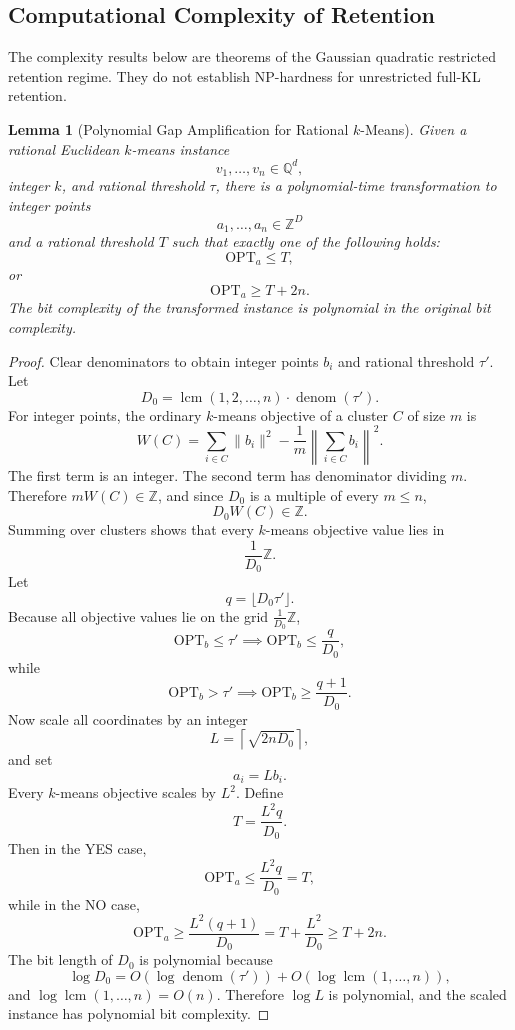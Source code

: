 \documentclass[12pt]{article}
\newtheorem{lemma}[theorem]{Lemma}
\theoremstyle{definition}
\begin{document}
\subsection{Computational Complexity of Retention}
\label{subsec:retention-complexity}

The complexity results below are theorems of the Gaussian quadratic restricted
retention regime.  They do not establish NP-hardness for unrestricted full-KL
retention.

\begin{lemma}[Polynomial Gap Amplification for Rational $k$-Means]
\label{lem:kmeans-gap}
Given a rational Euclidean $k$-means instance
\[
v_1,\dots,v_n\in\mathbb Q^d,
\]
integer $k$, and rational threshold $\tau$, there is a polynomial-time
transformation to integer points
\[
a_1,\dots,a_n\in\mathbb Z^D
\]
and a rational threshold $T$ such that exactly one of the following holds:
\[
\mathrm{OPT}_a\le T,
\]
or
\[
\mathrm{OPT}_a\ge T+2n.
\]
The bit complexity of the transformed instance is polynomial in the original
bit complexity.
\end{lemma}

\begin{proof}
Clear denominators to obtain integer points $b_i$ and rational threshold
$\tau'$.  Let
\[
D_0=\operatorname{lcm}(1,2,\dots,n)\cdot \operatorname{denom}(\tau').
\]
For integer points, the ordinary $k$-means objective of a cluster $C$ of size
$m$ is
\[
W(C)
=
\sum_{i\in C}\|b_i\|^2
-
\frac1m
\left\|
\sum_{i\in C}b_i
\right\|^2.
\]
The first term is an integer.  The second term has denominator dividing $m$.
Therefore $mW(C)\in\mathbb Z$, and since $D_0$ is a multiple of every
$m\le n$,
\[
D_0 W(C)\in\mathbb Z.
\]
Summing over clusters shows that every $k$-means objective value lies in
\[
\frac1{D_0}\mathbb Z.
\]
Let
\[
q=\lfloor D_0\tau'\rfloor.
\]
Because all objective values lie on the grid $\frac1{D_0}\mathbb Z$,
\[
\mathrm{OPT}_b\le\tau'
\implies
\mathrm{OPT}_b\le \frac{q}{D_0},
\]
while
\[
\mathrm{OPT}_b>\tau'
\implies
\mathrm{OPT}_b\ge \frac{q+1}{D_0}.
\]
Now scale all coordinates by an integer
\[
L=\left\lceil \sqrt{2nD_0}\right\rceil,
\]
and set
\[
a_i=Lb_i.
\]
Every $k$-means objective scales by $L^2$.  Define
\[
T=\frac{L^2 q}{D_0}.
\]
Then in the YES case,
\[
\mathrm{OPT}_a
\le
\frac{L^2 q}{D_0}
=
T,
\]
while in the NO case,
\[
\mathrm{OPT}_a
\ge
\frac{L^2(q+1)}{D_0}
=
T+\frac{L^2}{D_0}
\ge
T+2n.
\]
The bit length of $D_0$ is polynomial because
\[
\log D_0
=
O(\log\operatorname{denom}(\tau'))+O(\log\operatorname{lcm}(1,\dots,n)),
\]
and $\log\operatorname{lcm}(1,\dots,n)=O(n)$.  Therefore $\log L$ is
polynomial, and the scaled instance has polynomial bit complexity.
\end{proof}
\end{document}
